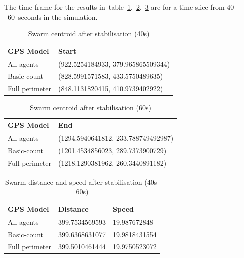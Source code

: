 The time frame for the results in~table~\ref{tab:SwarmSpeed1},~\ref{tab:SwarmSpeed2},~\ref{tab:SwarmSpeed3} are for a time slice from 40~-~60~seconds in the simulation.

\begin{table}[H]
\begin{center}
\begin{tabular}{| l | l |}
\hline
GPS Model & Start \\ \hline
All-agents & (922.5254184933, 379.965865509344) \\ \hline
Basic-count & (828.5991571583, 433.5750489635) \\ \hline
Full perimeter & (848.1131820415, 410.9739402922) \\ \hline
\end{tabular}\caption{Swarm centroid after stabilisation (40s)} \label{tab:SwarmSpeed1}
\end{center}
\end{table}

\begin{table}[H]
\begin{center}
\begin{tabular}{| l | l |}
\hline
GPS Model & End  \\ \hline
All-agents & (1294.5940641812, 233.788749492987) \\ \hline
Basic-count & (1201.4534856023, 289.7373900729) \\ \hline
Full perimeter & (1218.1290381962, 260.3440891182)\\ \hline
\end{tabular}\caption{Swarm centroid after stabilisation (60s)} \label{tab:SwarmSpeed2}
\end{center}
\end{table}

\begin{table}[H]
\begin{center}
\begin{tabular}{| l | l | l |}
\hline
GPS Model & Distance & Speed \\ \hline
All-agents &  399.7534569593 & 19.987672848 \\  \hline
Basic-count & 399.6368631077 & 19.9818431554 \\ \hline
Full perimeter & 399.5010461444 & 19.9750523072 \\  \hline
\end{tabular}\caption{Swarm distance and speed after stabilisation (40s-60s)} \label{tab:SwarmSpeed3}
\end{center}
\end{table}

